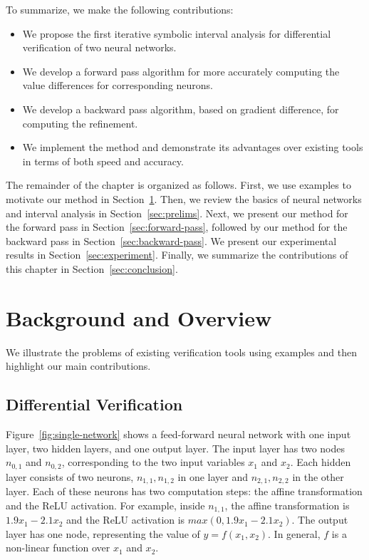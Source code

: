 To summarize, we make the following contributions:
\begin{itemize}
\item
We propose the first iterative symbolic interval analysis for
differential verification of two neural networks.
\item
We develop a forward pass algorithm for more accurately computing the
value differences for corresponding neurons.
\item
We develop a backward pass algorithm, based on gradient difference,
for computing the refinement.
\item
We implement the method and demonstrate its advantages over existing
tools in terms of both speed and accuracy.
\end{itemize}


The remainder of the chapter is organized as follows.  First, we use
examples to motivate our method in Section~\ref{sec:motivation}.
Then, we review the basics of neural networks and interval analysis in
Section~\ref{sec:prelims}.  Next, we present our method for the
forward pass in Section~\ref{sec:forward-pass}, followed by our method
for the backward pass in Section~\ref{sec:backward-pass}.  We present
our experimental results in Section~\ref{sec:experiment}. Finally, we
summarize the contributions of this chapter in Section~\ref{sec:conclusion}.


\section{Background and Overview}
\label{sec:motivation}

We illustrate the problems of existing verification tools using
examples and then highlight our main contributions.


\subsection{Differential Verification}

Figure~\ref{fig:single-network} shows a feed-forward neural network
with one input layer, two hidden layers, and one output layer.
%
The input layer has two nodes $n_{0,1}$ and $n_{0,2}$, corresponding to
the two input variables $x_1$ and $x_2$.
%
Each hidden layer consists of two neurons, $n_{1,1}, n_{1,2}$ in one
layer and $n_{2,1},n_{2,2}$ in the other layer.  Each of these neurons
has two computation steps: the affine transformation and the ReLU
activation.  For example, inside $n_{1,1}$, the affine transformation
is $1.9 x_1 -2.1 x_2$ and the ReLU activation is $max(0, 1.9 x_1 - 2.1
x_2)$.
%
The output layer has one node, representing the value of $y =
f(x_1,x_2)$. In general, $f$ is a non-linear function over $x_1$ and
$x_2$.



